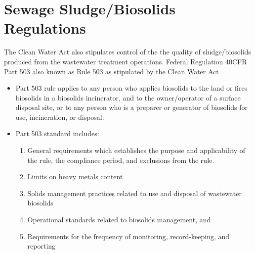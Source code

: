 \section{Sewage Sludge/Biosolids Regulations}
The Clean Water Act also stipulates control of the the quality of sludge/biosolids produced from the wastewater treatment operations.  Federal Regulation 40CFR Part 503 also known as Rule 503  as stipulated by the Clean Water Act 
			\begin{itemize}
				\item Part 503 rule applies to any person who applies biosolids to the land or fires biosolids in a biosolids incinerator, and to the owner/operator of a surface disposal site, or to any person who is a preparer or generator of biosolids for use, incineration, or disposal.
				\item Part 503 standard includes:
					\begin{enumerate}
						\item General requirements which establishes the purpose and applicability of the rule, the compliance period, and exclusions from the rule.
						\item Limits on heavy metals content
						\item Solids management practices related to use and disposal of wastewater biosolids
						\item Operational standards related to biosolids management, and
						\item Requirements for the frequency of monitoring, record-keeping, and reporting
					\end{enumerate}
			\end{itemize}

